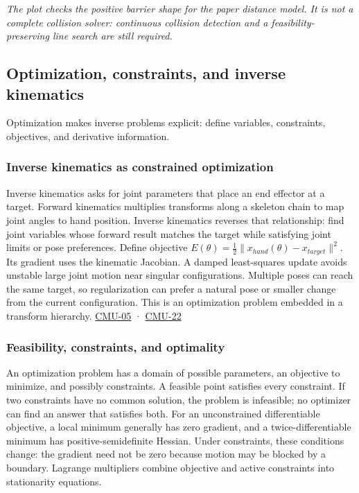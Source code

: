 \emph{The plot checks the positive barrier shape for the paper distance model. It is not a complete collision solver: continuous collision detection and a feasibility-preserving line search are still required.}

\subsection{Optimization, constraints, and inverse kinematics}\label{optimization-constraints-and-inverse-kinematics}

Optimization makes inverse problems explicit: define variables, constraints, objectives, and derivative information.

\subsubsection{Inverse kinematics as constrained optimization}\label{inverse-kinematics-as-constrained-optimization}

Inverse kinematics asks for joint parameters that place an end effector at a target. Forward kinematics multiplies transforms along a skeleton chain to map joint angles to hand position. Inverse kinematics reverses that relationship: find joint variables whose forward result matches the target while satisfying joint limits or pose preferences. Define objective \(E(\theta)=\tfrac12\|x_{hand}(\theta)-x_{target}\|^2\). Its gradient uses the kinematic Jacobian. A damped least-squares update avoids unstable large joint motion near singular configurations. Multiple poses can reach the same target, so regularization can prefer a natural pose or smaller change from the current configuration. This is an optimization problem embedded in a transform hierarchy. \hyperref[04-visual-computing-ii-ch036]{CMU-05} · \hyperref[04-visual-computing-ii-ch036]{CMU-22}

\subsubsection{Feasibility, constraints, and optimality}\label{feasibility-constraints-and-optimality}

An optimization problem has a domain of possible parameters, an objective to minimize, and possibly constraints. A feasible point satisfies every constraint. If two constraints have no common solution, the problem is infeasible; no optimizer can find an answer that satisfies both. For an unconstrained differentiable objective, a local minimum generally has zero gradient, and a twice-differentiable minimum has positive-semidefinite Hessian. Under constraints, these conditions change: the gradient need not be zero because motion may be blocked by a boundary. Lagrange multipliers combine objective and active constraints into stationarity equations.

